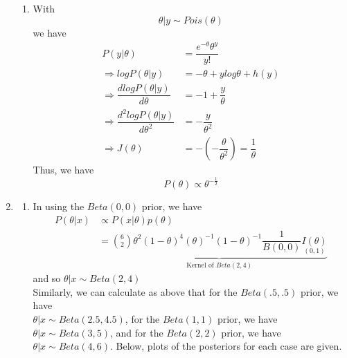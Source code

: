 \documentclass[12pt]{article}\usepackage[]{graphicx}\usepackage[]{color}
\newenvironment{knitrout}{}{} %
\begin{document}
\begin{enumerate}
\begin{enumerate}[label = (\alph*)]
\item 
With 
\[ \theta | y \sim Pois( \theta) \]
we have 
\begin{align*}
P(y | \theta) &= \dfrac{e^{- \theta} \theta^y}{y !}\\
\Longrightarrow log P(\theta | y) &= - \theta + y log \theta + h(y)\\
\Longrightarrow \dfrac{ d log P(\theta |y)}{d \theta} & = - 1 + \dfrac{y}{\theta}\\
\Longrightarrow \dfrac{d^2 log P(\theta | y)}{d \theta^2} & = - \dfrac{y}{\theta^2}\\
\Longrightarrow J(\theta) &= - (- \dfrac{\theta}{\theta^2}) = \dfrac{1}{\theta}
\end{align*}
Thus, we have 
\[ P(\theta) \propto \theta^{- \frac{1}{2}} \]
\end{enumerate}
\item
\begin{enumerate}[label = (\alph*)]
\item In using the $Beta(0,0)$ prior, we have
\begin{align*}
P(\theta | x) & \propto P(x | \theta) p(\theta)\\
&= \underbrace{{6 \choose 2} \theta^2(1 - \theta)^4 (\theta)^{-1} (1-\theta)^{-1} \dfrac{1}{B(0,0)} \underset{(0,1)}{I(\theta)}}_{\text{Kernel of } Beta(2,4)}
\end{align*}
and so $\theta|x \sim Beta(2,4)$\\

Similarly, we can calculate as above that for the $Beta(.5,.5)$ prior, we have \\ $\theta | x \sim Beta(2.5, 4.5)$, for  the $Beta(1,1)$ prior, we have $\theta | x \sim Beta(3,5)$, and for the $Beta(2,2)$ prior, we have  $\theta| x \sim Beta(4,6)$. Below, plots of the posteriors for each case are given. 

\begin{knitrout}
\color{fgcolor}


\end{knitrout}
\end{enumerate}
\end{enumerate}
\end{document}
